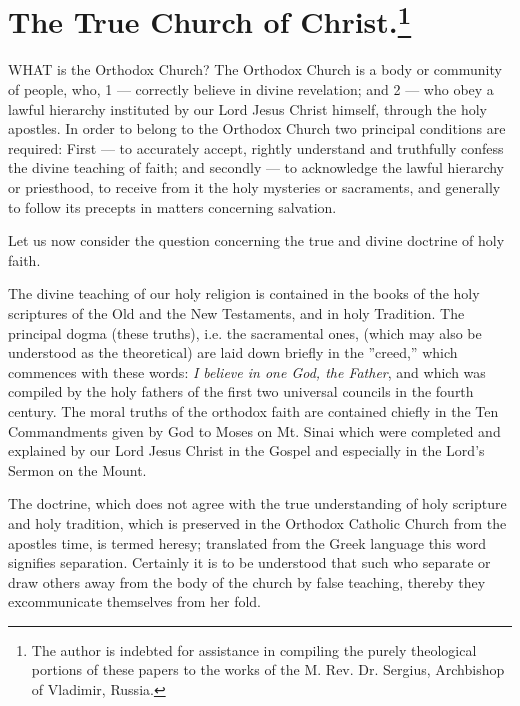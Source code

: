 \chapter{The True Church of Christ.\footnote{The author is indebted for assistance in compiling the purely theological portions of these papers to the works of the M. Rev. Dr. Sergius, Archbishop of Vladimir, Russia.}}

WHAT is the Orthodox Church? The 
Orthodox Church is a body or community
of people, who, 1 — correctly believe in divine revelation;
and 2 — who obey a lawful hierarchy instituted by our Lord 
Jesus Christ himself, through the holy apostles.
In order to belong to the Orthodox Church two principal conditions
are required: First — to accurately accept,
rightly understand and truthfully confess 
the divine teaching of faith; and secondly — 
to acknowledge the lawful hierarchy or priesthood,
to receive from it the holy mysteries or 
sacraments, and generally to follow its precepts 
in matters concerning salvation. 

Let us now consider the question concerning 
the true and divine doctrine of holy faith. 

The divine teaching of our holy religion is 
contained in the books of the holy scriptures of 
the Old and the New Testaments, and in holy 
Tradition. The principal dogma (these truths), 
i.e. the sacramental ones, (which may also be understood
as the theoretical) are laid down briefly 
in the ''creed,'' which commences with these 
words: \textit{I believe in one God, the Father}, and 
which was compiled by the holy fathers of the 
first two universal councils in the fourth century.
The moral truths of the orthodox faith 
are contained chiefly in the Ten Commandments 
given by God to Moses on Mt. Sinai 
which were completed and explained by our 
Lord Jesus Christ in the Gospel and especially in 
the Lord's Sermon on the Mount. 

The doctrine, which does not agree with the 
true understanding of holy scripture and holy 
tradition, which is preserved in the Orthodox
Catholic Church from the apostles time, is
termed heresy; translated from the Greek
language this word signifies separation. Certainly
it is to be understood that such who separate
or draw others away from the body of the 
church by false teaching, thereby they excommunicate
themselves from her fold. 


